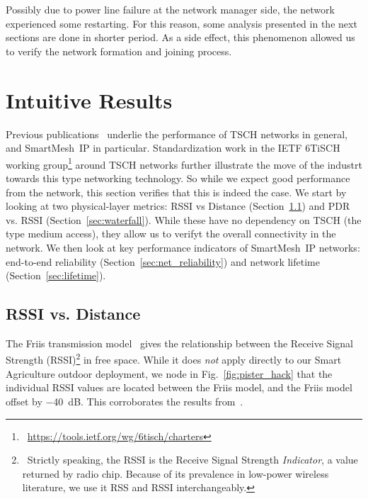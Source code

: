 \documentclass{sig-alternate}
\newcommand{\smip}                {SmartMesh~IP\xspace}
\begin{document}
Possibly due to power line failure at the network manager side, the network experienced some restarting.
For this reason, some analysis presented in the next sections are done in shorter period.
As a side effect, this phenomenon allowed us to verify the network formation and joining process.

\section{Intuitive Results}
\label{sec:intuitive}

Previous publications~\cite{watteyne15industrial,watteyne16peach,watteyne10mitigating,watteyne09reliability} underlie the performance of TSCH networks in general, and \smip in particular.
Standardization work in the IETF 6TiSCH working group\footnote{~\url{https://tools.ietf.org/wg/6tisch/charters}} around TSCH networks further illustrate the move of the industrt towards this type networking technology.
So while we expect good performance from the network, this section verifies that this is indeed the case.
We start by looking at two physical-layer metrics: RSSI vs Distance (Section~\ref{sec:rssi_distance}) and PDR vs. RSSI (Section~\ref{sec:waterfall}).
While these have no dependency on TSCH (the type medium access), they allow us to verifyt the overall connectivity in the network.
We then look at key performance indicators of \smip networks: end-to-end reliability (Section~\ref{sec:net_reliability}) and network lifetime (Section~\ref{sec:lifetime}).

\subsection{RSSI vs. Distance}
\label{sec:rssi_distance}

The Friis transmission model~\cite{saunders07antennas} gives the relationship between the Receive Signal Strength (RSSI)\footnote{~Strictly speaking, the RSSI is the Receive Signal Strength \textit{Indicator}, a value returned by radio chip. Because of its prevalence in low-power wireless literature, we use it RSS and RSSI interchangeably.} in free space.
While it does \textit{not} apply directly to our Smart Agriculture outdoor deployment, we node in Fig.~\ref{fig:pister_hack} that the individual RSSI values are located between the Friis model, and the Friis model offset by $-$40~dB.
This corroborates the results from~\cite{zats10wireless}.
\end{document}
